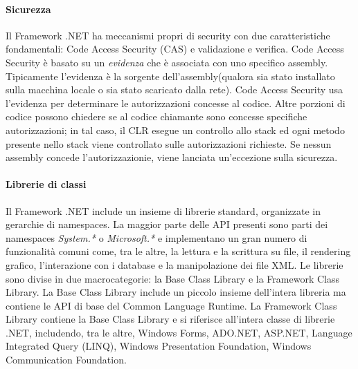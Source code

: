
\paragraph{Sicurezza}
Il Framework .NET ha meccanismi propri di security con due caratteristiche fondamentali: Code Access Security (CAS) e validazione e verifica.
Code Access Security è basato su un \emph{evidenza} che è associata con uno specifico assembly. Tipicamente l'evidenza è la sorgente dell'assembly(qualora sia stato installato sulla macchina locale o sia stato scaricato dalla rete).
Code Access Security usa l'evidenza per determinare le autorizzazioni concesse al codice.
Altre porzioni di codice possono chiedere se al codice chiamante sono concesse specifiche autorizzazioni; in tal caso, il CLR esegue un controllo allo stack ed ogni metodo presente nello stack viene controllato sulle autorizzazioni richieste. Se nessun assembly concede l'autorizzazionie, viene lanciata un'eccezione sulla sicurezza.
 
\paragraph{Librerie di classi}
Il Framework .NET include un insieme di librerie standard, organizzate in  gerarchie di namespaces. La maggior parte delle API presenti sono parti dei namespaces \emph{System.*} o \emph{Microsoft.*} e implementano un gran numero di funzionalità comuni come, tra le altre, la lettura e la scrittura su file, il rendering grafico, l'interazione con i database e la manipolazione dei file XML.
Le librerie sono divise in due macrocategorie: la Base Class Library e la Framework Class Library.
La Base Class Library include un piccolo insieme dell'intera libreria ma contiene le API di base del Common Language Runtime.
La Framework Class Library contiene la Base Class Library e si riferisce all'intera classe di librerie .NET, includendo, tra le altre, Windows Forms, ADO.NET, ASP.NET, Language Integrated Query (LINQ), Windows Presentation Foundation, Windows Communication Foundation.
